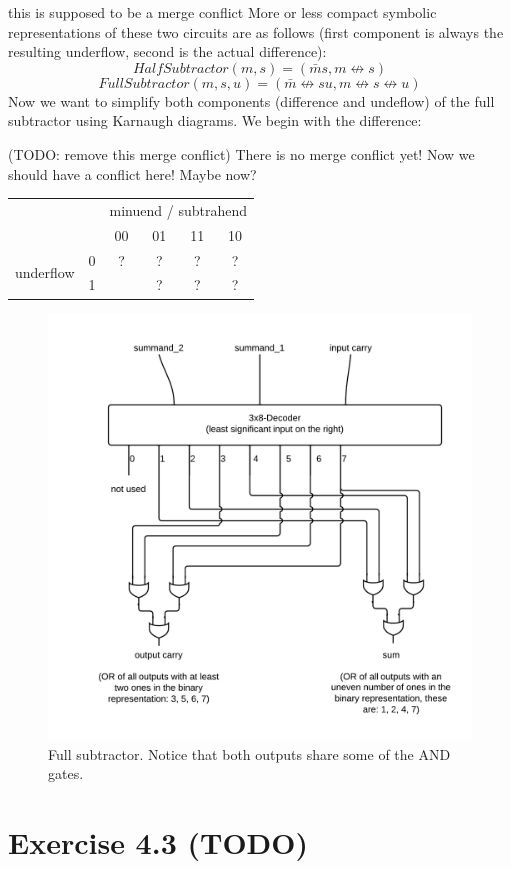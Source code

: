 \documentclass[10pt,a4paper]{scrartcl}
\newcommand{\subExercise}[1]{\vspace{0.5em} \noindent{\bf #1)}}
\begin{document}
this is supposed to be a merge conflict
\subExercise{b} 
More or less compact symbolic representations 
of these two circuits are as follows 
(first component is always the resulting underflow, 
 second is the actual difference):
\[
  HalfSubtractor(m,s) = (\bar m s, m \not\leftrightarrow s)
\]
\[
  FullSubtractor(m,s,u) = 
    (\bar m \not\leftrightarrow su, 
     m \not\leftrightarrow s \not\leftrightarrow u
    )
\]
\subExercise{c} 
Now we want to simplify both components (difference and undeflow) 
of the full subtractor using Karnaugh diagrams. We begin with the
difference:

(TODO: remove this merge conflict)
There is no merge conflict yet!
Now we should have a conflict here!
Maybe now?
\vspace{0.5em}
\begin{tabular}{|c c|c c c c|}
  \hline 
    & & \multicolumn{4}{c|}{minuend / subtrahend} \\
    & & 00 & 01 & 11 & 10 \\
  \hline
    \multirow{2}{*}{underflow} & 0 & ? & ? & ? & ? \\
                               & 1 & \cellcolor{red}{?} & ? & ? & ? \\
  \hline
\end{tabular}
 
\subExercise{d}
\vspace{1em}
\begin{figure}[h]
  \centering\includegraphics[width=0.6\linewidth]{images/fullAdder.png}
  \caption{Full subtractor. Notice that both outputs share some of the AND gates.}
\end{figure}
\vspace{1em}


\section*{Exercise 4.3 (TODO)}
\subExercise{a}
\subExercise{b}
\end{document}
